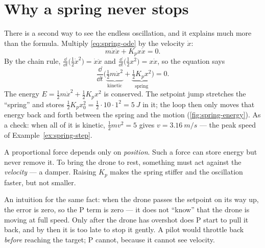 \section{Why a spring never stops}

There is a second way to see the endless oscillation, and it explains much more than the formula. Multiply \cref{eq:spring-ode} by the velocity $\dot x$:
\begin{equation}
  m\dot x\ddot x + K_p x\dot x = 0 .
\end{equation}
By the chain rule, $\frac{\dd}{\dd t}\big(\tfrac12\dot x^2\big) = \dot x\ddot x$ and $\frac{\dd}{\dd t}\big(\tfrac12 x^2\big) = x\dot x$, so the equation says
\begin{equation}
  \frac{\dd}{\dd t}\Big(\underbrace{\tfrac12 m\dot x^2}_{\text{kinetic}} + \underbrace{\tfrac12 K_p x^2}_{\text{spring}}\Big) = 0 .
\end{equation}
The energy $E = \tfrac12 m\dot x^2 + \tfrac12 K_p x^2$ is conserved. The setpoint jump stretches the \enquote{spring} and stores $\tfrac12 K_p x_0^2 = \tfrac12 \cdot 10 \cdot 1^2 = \SI{5}{J}$ in it; the loop then only moves that energy back and forth between the spring and the motion (\cref{fig:spring-energy}). As a check: when all of it is kinetic, $\tfrac12 m v^2 = 5$ gives $v = \SI{3.16}{m/s}$ — the peak speed of Example~\ref{ex:spring-step}.

\begin{keyidea}
A proportional force depends only on \emph{position}. Such a force can store energy but never remove it. To bring the drone to rest, something must act against the \emph{velocity} — a damper. Raising $K_p$ makes the spring stiffer and the oscillation faster, but not smaller.
\end{keyidea}

An intuition for the same fact: when the drone passes the setpoint on its way up, the error is zero, so the P term is zero — it does not \enquote{know} that the drone is moving at full speed. Only after the drone has overshot does P start to pull it back, and by then it is too late to stop it gently. A pilot would throttle back \emph{before} reaching the target; P cannot, because it cannot see velocity.

